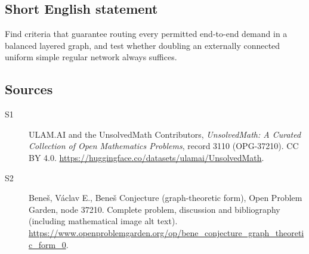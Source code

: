 \documentclass[11pt]{book}
\begin{document}
\subsection{Short English statement}
Find criteria that guarantee routing every permitted end-to-end demand in a balanced layered graph, and test whether doubling an externally connected uniform simple regular network always suffices.
\subsection{Sources}
\begin{description}
\item[\hypertarget{source:3110:1}{S1}] ULAM.AI and the UnsolvedMath Contributors, \emph{UnsolvedMath: A Curated Collection of Open Mathematics Problems}, record 3110 (OPG-37210). CC BY 4.0. \url{https://huggingface.co/datasets/ulamai/UnsolvedMath}.
\item[\hypertarget{source:3110:2}{S2}] Beneš, Václav E., Beneš Conjecture (graph-theoretic form), Open Problem Garden, node 37210. Complete problem, discussion and bibliography (including mathematical image alt text). \url{https://www.openproblemgarden.org/op/bene_conjecture_graph_theoretic_form_0}.
\end{description}
\label{end:3110}
\end{document}
